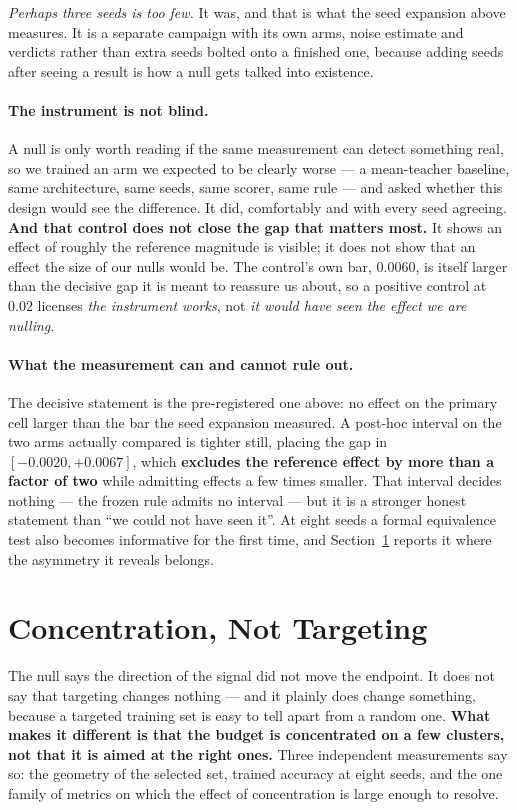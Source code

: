 \documentclass{article} %
\begin{document}
\emph{Perhaps three seeds is too few.} It was, and that is what the seed expansion above measures.
It is a separate campaign with its own arms, noise estimate and verdicts rather than extra seeds
bolted onto a finished one, because adding seeds after seeing a result is how a null gets talked
into existence.

\paragraph{The instrument is not blind.} A null is only worth reading if the same measurement can
detect something real, so we trained an arm we expected to be clearly worse --- a mean-teacher
baseline, same architecture, same seeds, same scorer, same rule --- and asked whether this design
would see the difference. It did, comfortably and with every seed agreeing.
\textbf{And that control does not close the gap that matters most.} It shows an effect of roughly
the reference magnitude is visible; it does not show that an effect the size of our nulls would be.
The control's own bar, $0.0060$, is itself larger than the decisive gap it is meant to reassure us
about, so a positive control at $0.02$ licenses \emph{the instrument works}, not \emph{it would have
seen the effect we are nulling}.

\paragraph{What the measurement can and cannot rule out.} The decisive statement is the
pre-registered one above: no effect on the primary cell larger than the bar the seed expansion
measured. A post-hoc interval on the two arms actually compared is tighter still,
placing the gap in $[-0.0020, +0.0067]$, which \textbf{excludes the reference effect by more than a
factor of two} while admitting effects a few times smaller. That interval decides nothing --- the
frozen rule admits no interval --- but it is a stronger honest statement than ``we could not have
seen it''. At eight seeds a formal equivalence test also becomes informative for the first time, and
Section~\ref{sec:concentration} reports it where the asymmetry it reveals belongs.

\section{Concentration, Not Targeting}
\label{sec:concentration}
The null says the direction of the signal did not move the endpoint. It does not say that targeting
changes nothing --- and it plainly does change something, because a targeted training set is easy to
tell apart from a random one. \textbf{What makes it different is that the budget is concentrated on
a few clusters, not that it is aimed at the right ones.} Three independent measurements say so: the
geometry of the selected set, trained accuracy at eight seeds, and the one family of metrics on
which the effect of concentration is large enough to resolve.
\end{document}
